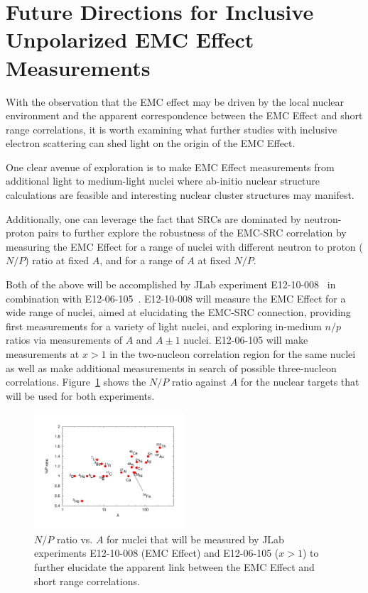 \section{Future Directions for Inclusive Unpolarized EMC Effect Measurements}

With the observation that the EMC effect may be driven by the local nuclear environment
and the apparent correspondence between the EMC Effect and short range correlations, it is worth examining what
further studies with inclusive electron scattering can shed light on the origin of the EMC Effect.

One clear avenue of exploration is to make EMC Effect measurements from additional light to medium-light
nuclei where ab-initio nuclear structure calculations are feasible and interesting nuclear cluster
structures may manifest.

Additionally, one can leverage the fact that SRCs are dominated by neutron-proton pairs to further explore
the robustness of the EMC-SRC correlation by measuring the EMC Effect for a range of nuclei with
different neutron to proton ($N/P$) ratio at fixed $A$, and for a range of $A$ at fixed $N/P$.

Both of the above will be accomplished by JLab experiment E12-10-008~\cite{12gev_emc} in combination
with E12-06-105~\cite{12gev_xgt1}. E12-10-008 will measure the EMC Effect for a wide range of nuclei,
aimed at elucidating the EMC-SRC connection, providing first measurements for a variety of light nuclei,
and exploring in-medium $n/p$ ratios via measurements of $A$ and $A\pm1$ nuclei.  E12-06-105 will make
measurements at $x>1$ in the two-nucleon correlation region for the same nuclei as well as make additional
measurements in search of possible three-nucleon correlations. Figure~\ref{fig:np_ratios} shows the $N/P$
ratio against $A$ for the nuclear targets that will be used for both experiments.

\begin{figure}[htb]
  \includegraphics[width=0.5\textwidth]{plots/np_ratios_2017.pdf}
  \caption{$N/P$ ratio vs. $A$ for nuclei that will be measured by JLab experiments E12-10-008 (EMC Effect)
    and E12-06-105 ($x>1$) to further elucidate the apparent link between the EMC Effect and short range
    correlations.}
  \label{fig:np_ratios}
\end{figure}
